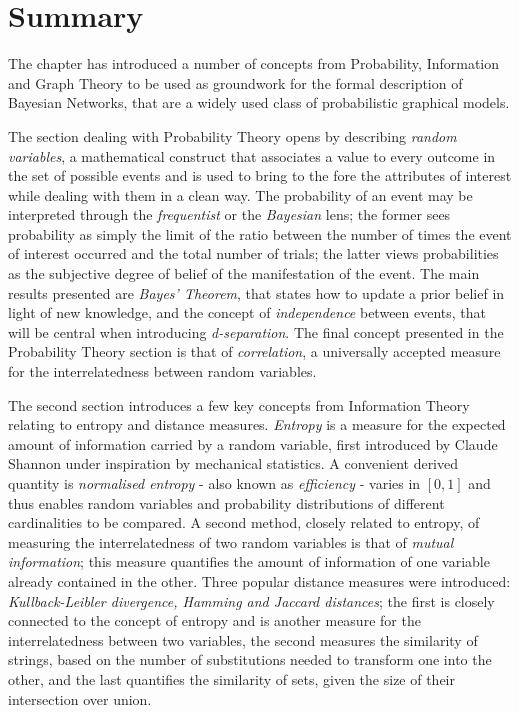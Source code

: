 \section{Summary}
The chapter has introduced a number of concepts from Probability, Information and Graph Theory to be used as groundwork for the formal description of Bayesian Networks, that are a widely used class of probabilistic graphical models.

The section dealing with Probability Theory opens by describing \textit{random variables}, a mathematical construct that associates a value to every outcome in the set of possible events and is used to bring to the fore the attributes of interest while dealing with them in a clean way.
The probability of an event may be interpreted through the \textit{frequentist} or the \textit{Bayesian} lens; the former sees probability as simply the limit of the ratio between the number of times the event of interest occurred and the total number of trials; the latter views probabilities as the subjective degree of belief of the manifestation of the event.
The main results presented are \textit{Bayes' Theorem}, that states how to update a prior belief in light of new knowledge, and the concept of \textit{independence} between events, that will be central when introducing \textit{d-separation}.
The final concept presented in the Probability Theory section is that of \textit{correlation}, a universally accepted measure for the interrelatedness between random variables.

The second section introduces a few key concepts from Information Theory relating to entropy and distance measures.
\textit{Entropy} is a measure for the expected amount of information carried by a random variable, first introduced by Claude Shannon under inspiration by mechanical statistics. 
A convenient derived quantity is \textit{normalised entropy} - also known as \textit{efficiency} - varies in $[0,1]$ and thus enables random variables and probability distributions of different cardinalities to be compared.
A second method, closely related to entropy, of measuring the interrelatedness of two random variables is that of \textit{mutual information}; this measure quantifies the amount of information of one variable already contained in the other.
Three popular distance measures were introduced: \textit{Kullback-Leibler divergence, Hamming and Jaccard distances}; the first is closely connected to the concept of entropy and is another measure for the interrelatedness between two variables, the second measures the similarity of strings, based on the number of substitutions needed to transform one into the other, and the last quantifies the similarity of sets, given the size of their intersection over union.

